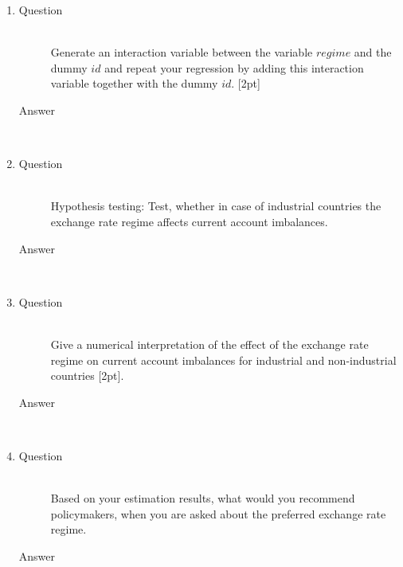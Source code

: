 \documentclass{article}
\begin{document}
\begin{enumerate}
  \begin{enumerate}[label=(\alph*)]
    \item 
    \begin{description}
      \item[Question] \hfill \\
      Generate an interaction variable between the variable \(regime\) and the dummy \(id\) and repeat your regression by adding this interaction variable together with the dummy \(id\). [2pt]
      \item[Answer] \hfill \\
    \end{description}
    \item 
    \begin{description}
      \item[Question] \hfill \\
      Hypothesis testing: Test, whether in case of industrial countries the exchange rate regime affects current account imbalances.
      \item[Answer] \hfill \\
    \end{description}
    \item 
    \begin{description}
      \item[Question] \hfill \\
      Give a numerical interpretation of the effect of the exchange rate regime on current account imbalances for industrial and non-industrial countries [2pt].
      \item[Answer] \hfill \\
    \end{description}
    \item 
    \begin{description}
      \item[Question] \hfill \\
      Based on your estimation results, what would you recommend policymakers, when you are asked about the preferred exchange rate regime.
      \item[Answer] \hfill \\
    \end{description}
  \end{enumerate}
\end{enumerate}
    
\end{document}
